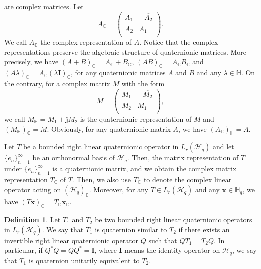 \documentclass[pdflatex,sn-mathphys-num]{sn-jnl}%
\theoremstyle{thmstyleone}%
\theoremstyle{thmstyletwo}%
\theoremstyle{thmstylethree}%
\newtheorem{definition}{Definition}%
\theoremstyle{definition}
\newtheorem{definition}[theorem]{Definition}
\theoremstyle{remark}
\begin{document}
are complex matrices. Let
\[
A_{\mathbb{C}}=
\begin{pmatrix}
A_1 & -\overline{A_2} \\
A_2 & \overline{A_1}\\
\end{pmatrix}.
\]
We call $A_\mathbb{C}$ the complex representation of $A$. Notice that the complex representations preserve the algebraic structure of quaternionic matrices. More precisely, we have $(A+B)_\mathbb{C}=A_\mathbb{C}+B_\mathbb{C}$, $(AB)_\mathbb{C}=A_\mathbb{C}B_\mathbb{C}$ and $( A\lambda)_{\mathbb{C}}=A_\mathbb{C}(\lambda\mathbf{I})_\mathbb{C}$,
for any quaternionic matrices $A$ and $B$ and any $\lambda\in\mathbb{H}$. On the contrary, for a complex matrix $M$ with the form
\[
M=\begin{pmatrix}
M_1 & -\overline{M_2} \\
M_2 & \overline{M_1} \\
\end{pmatrix},
\]
we call $M_\mathbb{H}=M_1+\boldsymbol{j}M_2$ is the quaternionic representation of $M$ and
$(M_{\mathbb{H}})_{\mathbb{C}}=M$. Obviously, for any quaternionic matrix $A$, we have $(A_{\mathbb{C}})_{\mathbb{H}}=A$.

Let $T$ be a bounded right linear quaternionic operator in $L_r(\mathcal{H}_q)$ and let $\{e_n\}_{n=1}^\infty$ be an orthonormal basis  of $\mathcal{H}_q$. Then, the matrix representation
of $T$ under $\{e_n\}_{n=1}^\infty$ is a quaternionic matrix, and we obtain the complex matrix representation $T_{\mathbb{C}}$ of $T$. Then, we also use $T_{\mathbb{C}}$ to denote the complex linear operator acting on $(\mathcal{H}_q)_{\mathbb{C}}$. Moreover, for any  $T\in L_r(\mathcal{H}_q)$ and any
$\boldsymbol{x}\in\mathbb{H}_q$, we have $(T\boldsymbol{x})_{\mathbb{C}}=T_{\mathbb{C}}\boldsymbol{x}_{\mathbb{C}}$.


\begin{definition}
Let $T_1$ and $T_2$ be two bounded right linear quaternionic operators in $L_r(\mathcal{H}_q)$. We say that $T_1$ is quaternion similar to $T_2$ if there exists an invertible right linear quaternionic operator $Q$ such that
$QT_1=T_2Q$. In particular, if $Q^*Q=QQ^*=\boldsymbol{I}$, where $\boldsymbol{I}$ means the identity operator on $\mathcal{H}_q$, we say that $T_1$ is quaternion unitarily equivalent to $T_2$.
\end{definition}
\end{document}
